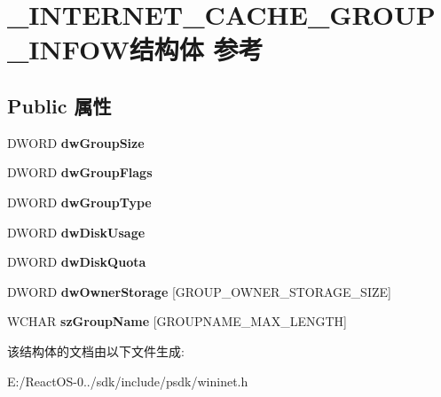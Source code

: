 \hypertarget{struct___i_n_t_e_r_n_e_t___c_a_c_h_e___g_r_o_u_p___i_n_f_o_w}{}\section{\+\_\+\+I\+N\+T\+E\+R\+N\+E\+T\+\_\+\+C\+A\+C\+H\+E\+\_\+\+G\+R\+O\+U\+P\+\_\+\+I\+N\+F\+O\+W结构体 参考}
\label{struct___i_n_t_e_r_n_e_t___c_a_c_h_e___g_r_o_u_p___i_n_f_o_w}
\subsection*{Public 属性}
\begin{DoxyCompactItemize}
\item 
\mbox{\label{struct___i_n_t_e_r_n_e_t___c_a_c_h_e___g_r_o_u_p___i_n_f_o_w_ae91756675223d2fb43427279f79bdb19}} 
D\+W\+O\+RD {\bfseries dw\+Group\+Size}
\item 
\mbox{\label{struct___i_n_t_e_r_n_e_t___c_a_c_h_e___g_r_o_u_p___i_n_f_o_w_a46aa2089238fed91b598e804949694c3}} 
D\+W\+O\+RD {\bfseries dw\+Group\+Flags}
\item 
\mbox{\label{struct___i_n_t_e_r_n_e_t___c_a_c_h_e___g_r_o_u_p___i_n_f_o_w_a4a0f7244c4e8dd29ad628f51644c250b}} 
D\+W\+O\+RD {\bfseries dw\+Group\+Type}
\item 
\mbox{\label{struct___i_n_t_e_r_n_e_t___c_a_c_h_e___g_r_o_u_p___i_n_f_o_w_aff74a9cd7b139422fc9bb02f87d25c66}} 
D\+W\+O\+RD {\bfseries dw\+Disk\+Usage}
\item 
\mbox{\label{struct___i_n_t_e_r_n_e_t___c_a_c_h_e___g_r_o_u_p___i_n_f_o_w_a1bdf4d09ba20ffe84be8f8a966be977a}} 
D\+W\+O\+RD {\bfseries dw\+Disk\+Quota}
\item 
\mbox{\label{struct___i_n_t_e_r_n_e_t___c_a_c_h_e___g_r_o_u_p___i_n_f_o_w_aaec1e22729b0bafdd4d1c8e495bbd0a1}} 
D\+W\+O\+RD {\bfseries dw\+Owner\+Storage} \mbox{[}G\+R\+O\+U\+P\+\_\+\+O\+W\+N\+E\+R\+\_\+\+S\+T\+O\+R\+A\+G\+E\+\_\+\+S\+I\+ZE\mbox{]}
\item 
\mbox{\label{struct___i_n_t_e_r_n_e_t___c_a_c_h_e___g_r_o_u_p___i_n_f_o_w_a5ff5821bd3ea520e3acd760f4adeb62e}} 
W\+C\+H\+AR {\bfseries sz\+Group\+Name} \mbox{[}G\+R\+O\+U\+P\+N\+A\+M\+E\+\_\+\+M\+A\+X\+\_\+\+L\+E\+N\+G\+TH\mbox{]}
\end{DoxyCompactItemize}


该结构体的文档由以下文件生成\+:\begin{DoxyCompactItemize}
\item 
E\+:/\+React\+O\+S-\/0../sdk/include/psdk/wininet.\+h\end{DoxyCompactItemize}
